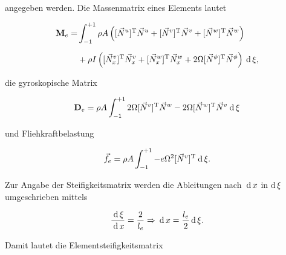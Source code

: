 	angegeben werden. Die Massenmatrix eines Elements lautet
	
	\begin{equation}\label{equ:Massenmatrix}
	\begin{aligned}
	\mathbf{M}_{e} = & \int_{-1}^{+1} \rho A\left(   [\vec{N}^{u}]^{\mathrm{T}}\vec{N}^{u} + [\vec{N}^{v}]^{\mathrm{T}}\vec{N}^{v} + [\vec{N}^{w}]^{\mathrm{T}}\vec{N}^{w}\right) \\[2mm]
	& + \rho I \left(  [\vec{N}_{x}^{v}]^{\mathrm{T}}\vec{N}_{x}^{v} + [\vec{N}_{x}^{w}]^{\mathrm{T}}\vec{N}_{x}^{w} + 2\Omega[\vec{N}^{\phi}]^{\mathrm{T}}\vec{N}^{\phi}\right)   \: \mathrm{d}\, \xi,
	\end{aligned}
	\end{equation}
	
	die gyroskopische Matrix
	
	\begin{equation}\label{equ:Gyroskopische-Matrix}
	\mathbf{D}_{e} = \rho A\int_{-1}^{+1} 2\Omega[\vec{N}^{v}]^{\mathrm{T}}\vec{N}^{w} - 2\Omega[\vec{N}^{w}]^{\mathrm{T}}\vec{N}^{v} \: \mathrm{d}\, \xi
	\end{equation}
	
	und Fliehkraftbelastung
	
	\begin{equation}\label{equ:Fliehkraft}
	\vec{f}_{e} = \rho A\int_{-1}^{+1} -e\Omega^{2}[\vec{N}^{v}]^{\mathrm{T}} \: \mathrm{d}\, \xi .
	\end{equation}
	
	
	
	Zur Angabe der Steifigkeitsmatrix werden die Ableitungen nach $ \: \mathrm{d}\, x $ in $ \mathrm{d}\, \xi $ umgeschrieben mittels
	
	\begin{equation}\label{equ:Zusammenhang-dx-dxi}
	\dfrac{\,\mathrm{d} \, \xi}{\: \mathrm{d}\, x}=\dfrac{2}{l_{e}} \Rightarrow \: \mathrm{d}\, x=\dfrac{l_{e}}{2}\,\mathrm{d}\, \xi.
	\end{equation}
	
	Damit lautet die Elementsteifigkeitsmatrix
	

